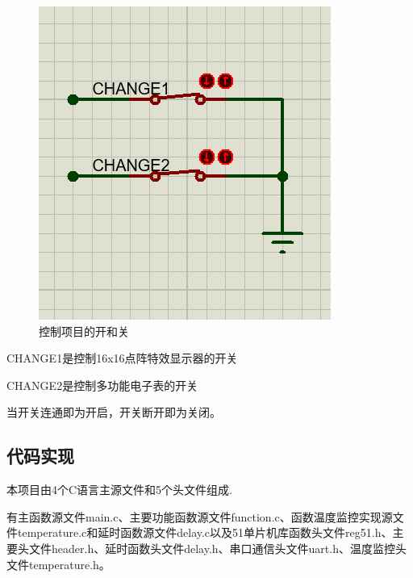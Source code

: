 \documentclass{textreportclass}  %
\begin{document}
	\begin{figure}[htbp]
		\centering
		\includegraphics[scale=0.4]{Fig/控制区三.png}
		\caption{控制项目的开和关}\label{Fig.38}
	\end{figure}
	CHANGE1是控制16x16点阵特效显示器的开关
	
	CHANGE2是控制多功能电子表的开关
	
	当开关连通即为开启，开关断开即为关闭。
	
	
	\vspace{1cm}
	
	\subsection{代码实现}                       %
	本项目由4个C语言主源文件和5个头文件组成.
	
	有主函数源文件main.c、主要功能函数源文件function.c、函数温度监控实现源文件temperature.c和延时函数源文件delay.c以及51单片机库函数头文件reg51.h、主要头文件header.h、延时函数头文件delay.h、串口通信头文件uart.h、温度监控头文件temperature.h。
	
\end{document}
